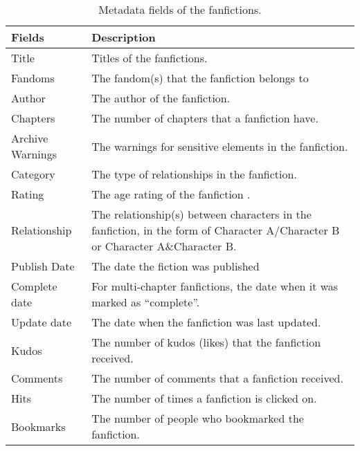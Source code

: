 \documentclass[letterpaper]{article} %
\begin{document}
\begin{table*}
\centering
\begin{tabular}[width=0.8\textwidth]{p{3cm}p{10cm}}
\toprule
Fields & Description \\ 
   \hline			
Title & Titles of the fanfictions.  \\
Fandoms & The fandom(s) that the fanfiction belongs to \\
Author & The author of the fanfiction.  \\
Chapters & The number of chapters that a fanfiction have. \\
Archive Warnings & The warnings for sensitive elements in the fanfiction. \\
Category & The type of relationships in the fanfiction. \\
Rating & The age rating of the fanfiction . \\
Relationship & The relationship(s) between characters in the fanfiction, in the form of Character A/Character B
or Character A\&Character B. \\
Publish Date & The date the fiction was published \\
Complete date & For multi-chapter fanfictions, the date when it was marked as ``complete''.\\
Update date & The date when the fanfiction was last updated. \\
\hline
Kudos & The number of kudos (likes) that the fanfiction received. \\
Comments & The number of comments that a fanfiction received.\\
Hits & The number of times a fanfiction is clicked on. \\
Bookmarks & The number of people who bookmarked the fanfiction.\\

\bottomrule
\end{tabular}
\caption{Metadata fields of the fanfictions.}
\label{tab:metadata}
\end{table*}%
\end{document}
